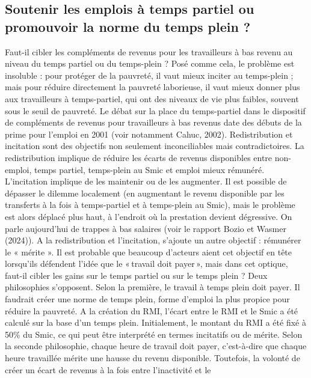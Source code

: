 \documentclass[
  french,
]{article}
\begin{document}
\subsection{Soutenir les emplois à temps partiel ou promouvoir la norme
du temps plein
?}\label{soutenir-les-emplois-uxe0-temps-partiel-ou-promouvoir-la-norme-du-temps-plein}

Faut-il cibler les compléments de revenus pour les travailleurs à bas
revenu au niveau du temps partiel ou du temps-plein ? Posé comme cela,
le problème est insoluble : pour protéger de la pauvreté, il vaut mieux
inciter au temps-plein ; mais pour réduire directement la pauvreté
laborieuse, il vaut mieux donner plus aux travailleurs à temps-partiel,
qui ont des niveaux de vie plus faibles, souvent sous le seuil de
pauvreté. Le débat sur la place du temps-partiel dans le dispositif de
compléments de revenus pour travailleurs à bas revenus date des débuts
de la prime pour l'emploi en 2001 (voir notamment Cahuc, 2002).
Redistribution et incitation sont des objectifs non seulement
inconciliables mais contradictoires. La redistribution implique de
réduire les écarts de revenus disponibles entre non-emploi, temps
partiel, temps-plein au Smic et emploi mieux rémunéré. L'incitation
implique de les maintenir ou de les augmenter. Il est possible de
dépasser le dilemme localement (en augmentant le revenu disponible par
les transferts à la fois à temps-partiel et à temps-plein au Smic), mais
le problème est alors déplacé plus haut, à l'endroit où la prestation
devient dégressive. On parle aujourd'hui de trappes à bas salaires (voir
le rapport Bozio et Wasmer (2024)). A la redistribution et l'incitation,
s'ajoute un autre objectif : rémunérer le « mérite ». Il est probable
que beaucoup d'acteurs aient cet objectif en tête lorsqu'ils défendent
l'idée que le «\,travail doit payer\,», mais dans cet optique, faut-il
cibler les gains sur le temps partiel ou sur le temps plein ? Deux
philosophies s'opposent. Selon la première, le travail à temps plein
doit payer. Il faudrait créer une norme de temps plein, forme d'emploi
la plus propice pour réduire la pauvreté. A la création du RMI, l'écart
entre le RMI et le Smic a été calculé sur la base d'un temps plein.
Initialement, le montant du RMI a été fixé à 50\% du Smic, ce qui peut
être interprété en termes incitatifs ou de mérite. Selon la seconde
philosophie, chaque heure de travail doit payer, c'est-à-dire que chaque
heure travaillée mérite une hausse du revenu disponible. Toutefois, la
volonté de créer un écart de revenus à la fois entre l'inactivité et le
\end{document}
